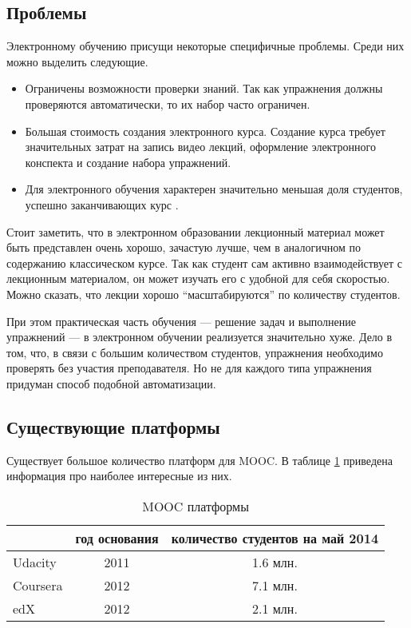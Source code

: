 \documentclass{matmex-diploma-custom}
\begin{document}
\subsection*{Проблемы}
Электронному обучению присущи некоторые специфичные проблемы. Среди них
можно выделить следующие.
\begin{itemize}
\item Ограничены возможности проверки знаний. Так как упражнения
  должны проверяются автоматически, то их набор часто ограничен.
\item Большая стоимость создания электронного курса. Создание курса требует
  значительных затрат на запись видео лекций, оформление электронного
  конспекта и создание набора упражнений.
\item Для электронного обучения характерен значительно
  меньшая доля студентов, успешно заканчивающих курс \cite{Clow}.
\end{itemize}

Стоит заметить, что в электронном образовании лекционный материал
может быть представлен очень хорошо, зачастую лучше, чем в аналогичном
по содержанию классическом курсе. Так как студент сам активно
взаимодействует с лекционным материалом, он может изучать его с
удобной для себя скоростью. Можно сказать, что лекции хорошо
``масштабируются'' по количеству студентов.

При этом практическая часть обучения --- решение задач и выполнение
упражнений --- в электронном обучении реализуется значительно хуже.
Дело в том, что, в связи с большим количеством студентов, упражнения
необходимо проверять без участия преподавателя. Но не для каждого типа
упражнения придуман способ подобной автоматизации.

\subsection*{Существующие платформы}

Существует большое количество платформ для MOOC. В таблице
\ref{table:platforms} приведена информация про наиболее интересные из
них.

\begin{table}[t]
  \centering
\begin{tabular}{|l|c|c|}
\hline
 & год основания & количество студентов на май 2014 \\
\hline
Udacity & 2011 & 1.6 млн. \\
Coursera & 2012 & 7.1 млн. \\
edX & 2012 & 2.1 млн. \\
\hline
\end{tabular}
  \caption{MOOC платформы}
   \label{table:platforms}
\end{table}
\end{document}
